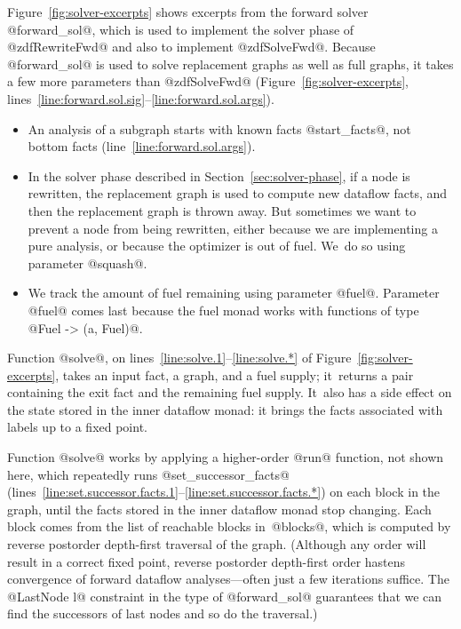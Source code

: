 \documentclass[blockstyle,preprint,natbib,nocopyrightspace]{sigplanconf}
\newcommand\lineref[1]{line~\ref{line:#1}}
\newcommand\linerangeref[2]{\mbox{lines~\ref{line:#1}--\ref{line:#2}}}
\newcommand\secref[1]{Section~\ref{sec:#1}}
\newcommand\figref[1]{Figure~\ref{fig:#1}}
\begin{document}
\figref{solver-excerpts} shows excerpts from the forward solver 
@forward_sol@, which is used to implement the solver phase of
@zdfRewriteFwd@ and also to implement
@zdfSolveFwd@.
Because @forward_sol@ is used to solve replacement graphs as well as
full graphs, it
takes a few more parameters than @zdfSolveFwd@
(\figref{solver-excerpts}, \linerangeref{forward.sol.sig}{forward.sol.args}).
\begin{itemize}
\item
An analysis of a subgraph starts with known facts @start_facts@, not
bottom facts (\lineref{forward.sol.args}).
\item
In the solver phase described in \secref{solver-phase},
if a node is rewritten, the replacement graph is used to compute new
dataflow facts, and then the replacement graph is thrown away.
But sometimes we want to prevent a node from being rewritten,
either because
we are implementing a pure analysis, or because the optimizer
is out of fuel. 
We~do so using parameter @squash@.
\item
We track the amount of fuel remaining using
parameter @fuel@.
Parameter @fuel@ comes last because the fuel monad works with
functions of type @Fuel -> (a, Fuel)@.
\end{itemize}
%
Function @solve@, on \linerangeref{solve.1}{solve.*} of
\figref{solver-excerpts}, 
takes an input fact, a graph, and a fuel supply; it~returns a pair
containing the exit fact and the 
remaining fuel supply.
It~also has a side effect on the state stored in the inner dataflow monad:
it brings the facts associated with labels up to a fixed point.
 
Function @solve@ works by applying a higher-order @run@ function,
not shown here,
which repeatedly runs
@set_successor_facts@
(\linerangeref{set.successor.facts.1}{set.successor.facts.*})
on each block in the graph, until the facts
stored in the inner dataflow monad stop changing.
Each block comes from  the list of reachable blocks in~@blocks@,
which is computed by reverse postorder depth-first traversal of the graph.
(Although any order will result in a correct fixed point,
reverse postorder depth-first order hastens convergence of forward dataflow
analyses---often just a few iterations suffice.
The @LastNode l@ constraint in the type of @forward_sol@
guarantees that we can
  find the successors of last nodes and so do the traversal.)
\end{document}

